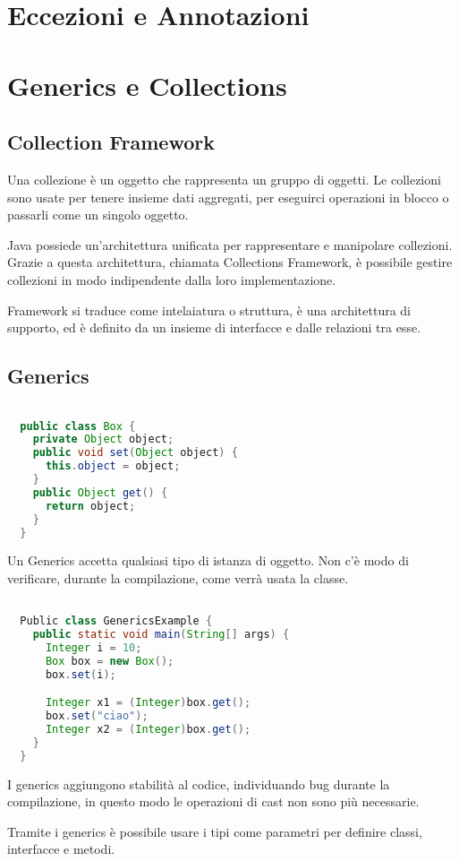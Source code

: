 \documentclass[a4paper,12pt,twoside]{book}
\begin{document}
\chapter{Eccezioni e Annotazioni}

\chapter{Generics e Collections}
\section{Collection Framework}

Una collezione è un oggetto che rappresenta un gruppo di oggetti. Le
collezioni sono usate per tenere insieme dati aggregati, per eseguirci
operazioni in blocco o passarli come un singolo oggetto.

Java possiede un'architettura unificata per rappresentare e manipolare
collezioni. Grazie a questa architettura, chiamata Collections
Framework, è possibile gestire collezioni in modo indipendente dalla
loro implementazione.

Framework si traduce come intelaiatura o struttura, è una architettura
di supporto, ed è definito da un insieme di interfacce e dalle
relazioni tra esse.

\section{Generics}
\begin{lstlisting}[caption={},
  label={lst:generics},language=Java]

  public class Box {
    private Object object;
    public void set(Object object) {
      this.object = object;
    }
    public Object get() {
      return object;
    }
  }
\end{lstlisting}

Un Generics accetta qualsiasi tipo di istanza di oggetto. Non c'è modo
di verificare, durante la compilazione, come verrà usata la classe.

\begin{lstlisting}[caption={Generics},
  label={lst:genericsExample},language=Java]

  Public class GenericsExample {
    public static void main(String[] args) {
      Integer i = 10;
      Box box = new Box();
      box.set(i);

      Integer x1 = (Integer)box.get();
      box.set("ciao");
      Integer x2 = (Integer)box.get();
    }
  }

\end{lstlisting}

I generics aggiungono stabilità al codice, individuando bug durante la
compilazione, in questo modo le operazioni di cast non sono più
necessarie.

Tramite i generics è possibile usare i tipi come parametri per
definire classi, interfacce e metodi. %
\end{document}
